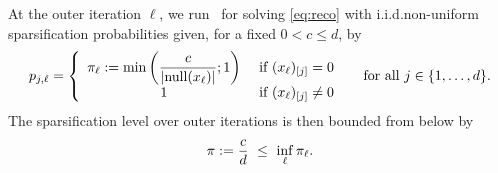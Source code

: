 At the outer iteration $\ell$, we run \spyI~for solving \eqref{eq:reco} with i.i.d.\;non-uniform sparsification probabilities given, for a fixed $0<c\leq d$, by
\begin{align}
\label{eq:pvec}
p_{j,\ell} = \left\{ \begin{array}{cr}
 \pi_\ell := \min\left(\displaystyle\frac{c}{|\mathrm{null}(x_\ell)|};1\right) & \text{ if } (x_\ell)_{[j]} = 0 \\
   1  &  \text{ if } (x_\ell)_{[j]} \neq  0 
\end{array}   \right. ~~~~ \text{for all $j\in\{1,\dots,d\}$}.
\end{align}
The sparsification level over outer iterations is then bounded from below by
\begin{align*}
     \pi := \frac{c}{d} ~\leq~ \inf_\ell \pi_\ell.
\end{align*}


